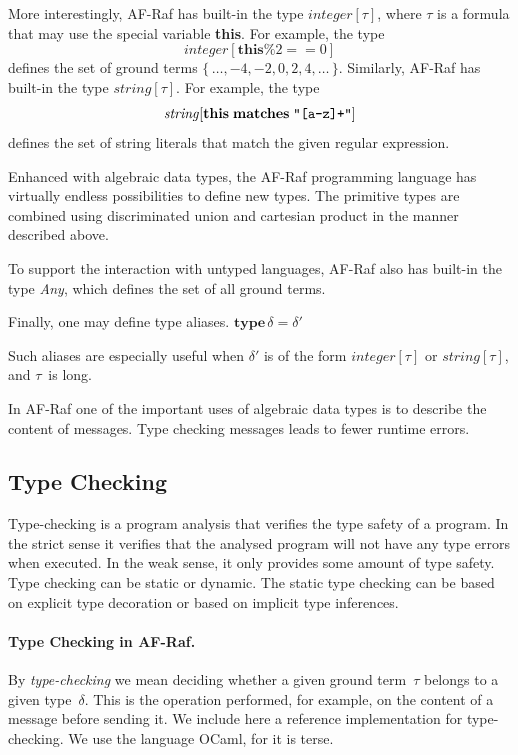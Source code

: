 \documentclass[a4paper,12pt,oneside,fleqn]{book} %
\newcommand{\todo}[1]{[\textcolor{red}{TODO}: #1]}
\begin{document}
{More interestingly, AF-Raf has built-in the type $\mathit{integer}[\tau]$,
where $\tau$ is a formula that may use the special variable \textbf{this}.
For example, the type \[\mathit{integer}[\mathbf{this}\%2==0]\] defines the
set of ground terms $\{\,\ldots,-4,-2,0,2,4,\ldots\,\}$. Similarly, AF-Raf
has built-in the type $\mathit{string}[\tau]$. For example, the type
\[\mathit{string}[\mathbf{this}\;\mathbf{matches}\;\verb|"[a-z]+"|]\]
defines the set of string literals that match the given regular expression.

Enhanced with algebraic data types, the AF-Raf programming language has
virtually endless possibilities to define new types. The primitive types
are combined using discriminated union and cartesian product in the manner
described above.

To support the interaction with untyped languages, AF-Raf also has built-in
the type \textit{Any}, which defines the set of all ground terms.

Finally, one may define type aliases.
$\mathbf{type}\,\delta=\delta'$

Such aliases are especially useful when $\delta'$ is of the form
$\mathit{integer}[\tau]$ or $\mathit{string}[\tau]$, and $\tau$~is long.


In AF-Raf one of the important uses of algebraic data types is to describe
the content of messages. Type checking messages leads to fewer runtime
errors.

\subsection{Type Checking}\label{sec:concepts-adt-check} %
Type-checking is a program analysis that verifies the type safety of a
program. In the strict sense it verifies that the analysed program
will not have any type errors when executed. In the weak sense, it only
provides some amount of type safety. Type checking can be static or
dynamic. The static type checking can be based on explicit type decoration
or based on implicit type inferences.


\paragraph{Type Checking in AF-Raf.}
By \emph{type-checking} we mean deciding whether a given ground term~$\tau$
belongs to a given type~$\delta$. This is the operation performed, for
example, on the content of a message before sending it. We include here a
reference implementation for type-checking. We use the language OCaml, for
it is terse.

}
\end{document}
